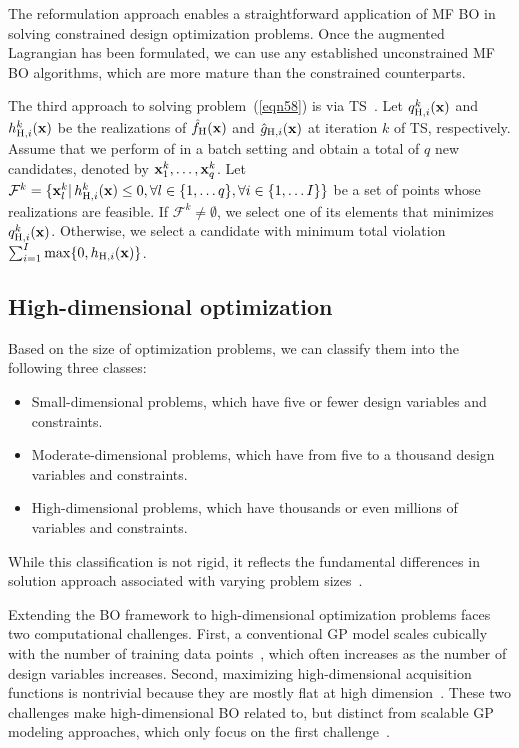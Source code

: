 \documentclass[iicol,sn-basic]{sn-jnl}%
\begin{document}
The reformulation approach enables a straightforward application of MF BO in solving constrained design optimization problems.
Once the augmented Lagrangian has been formulated, we can use any established unconstrained MF BO algorithms, which are more mature than the constrained counterparts.

The third approach to solving problem~(\ref{eqn58}) is via TS~\citep{Eriksson2021}.
Let $q^k_{\text{H},i}({\bf x})$ and $h^k_{\text{H},i}({\bf x})$ be the realizations of $\hat{f}_{\text{H}}({\bf x})$ and $\hat{g}_{\text{H},i}({\bf x})$ at iteration $k$ of TS, respectively.
Assume that we perform  of  in a batch setting and obtain a total of $q$ new candidates, denoted by ${\bf x}^k_1,\dots, {\bf x}^k_q$.
Let $\mathcal{F}^k = \{{\bf x}^k_l|\,h^k_{\text{H},i}({\bf x}) \leq 0,\forall l \in \{1,\dots q\}, \forall i \in \{1,\dots I\}\}$ be a set of points whose realizations are feasible.
If $\mathcal{F}^k \neq \emptyset$, we select one of its elements that minimizes $q^k_{\text{H},i}({\bf x})$.
Otherwise, we select a candidate with minimum total violation
$\sum_{i=1}^{I} \max\{0,h_{\text{H},i}({\bf x})\}$.

\subsection{High-dimensional optimization}\label{Sec62}

Based on the size of optimization problems, we can classify them into the following three classes: 
\begin{itemize}
	\item Small-dimensional problems, which have five or fewer design variables and constraints.
	
	\item Moderate-dimensional problems, which have from five to a thousand design variables and constraints.
	
	\item High-dimensional problems, which have thousands or even millions of variables and constraints.
\end{itemize}
While this classification is not rigid, it reflects the fundamental differences in solution approach associated with varying problem sizes~\citep{Luenberger2008}.

Extending the BO framework to high-dimensional optimization problems faces two computational challenges.
First, a conventional GP model scales cubically with the number of training data points~\citep{Rasmussen2006}, which often increases as the number of design variables increases.
Second, maximizing high-dimensional acquisition functions is nontrivial because they are mostly flat at high dimension~\citep{Rana2017}.
These two challenges make high-dimensional BO related to, but distinct from scalable GP modeling approaches, which only focus on the first challenge~\citep{LiuH2020}. 
\end{document}
